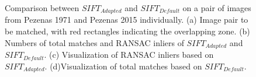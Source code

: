 \begin{figure}[htbp]
\begin{center}
{\begin{minipage}[t]{0.48\linewidth}
			\end{minipage}%
		}
		\caption{Comparison between $SIFT_{Adapted}$ and $SIFT_{Default}$ on a pair of images from Pezenas 1971 and Pezenas 2015 individually. (a) Image pair to be matched, with red rectangles indicating the overlapping zone. (b) Numbers of total matches and RANSAC inliers of $SIFT_{Adapted}$ and $SIFT_{Default}$. (c) Visualization of RANSAC inliers based on $SIFT_{Adapted}$. (d)Visualization of total matches based on $SIFT_{Default}$.}
		\label{SIFTComp_ImgPair}
	\end{center}
\end{figure} 

